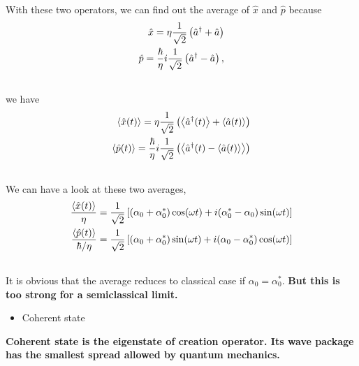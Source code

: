 \documentclass[letterpaper,10pt,english]{sphinxmanual}
\newcommand{\avg}[1]{\left< #1 \right>}
\begin{document}
With these two operators, we can find out the average of $\hat x$ and $\hat p$ because
\begin{gather}
\begin{split}\hat x = \eta \frac{1}{\sqrt 2} \left( \hat a^\dagger + \hat a\right)\\
\hat p = \frac{\hbar}{\eta} i \frac{1}{\sqrt 2} \left(\hat a^\dagger - \hat a \right) ,\end{split}\notag\\\begin{split}\end{split}\notag
\end{gather}
we have
\begin{gather}
\begin{split}\avg{\hat x(t)} = \eta \frac{1}{\sqrt 2} \left( \avg{\hat a^\dagger (t)} + \avg{\hat a(t)} \right) \\
\avg{\hat p(t)} = \frac{\hbar}{\eta} i \frac{1}{\sqrt {2} } \left( \avg{\hat a^\dagger (t) - \avg{\hat a(t)}} \right)\end{split}\notag\\\begin{split}\end{split}\notag
\end{gather}
We can have a look at these two averages,
\begin{gather}
\begin{split}\frac{\avg{\hat x(t)} }{\eta} = \frac{1}{\sqrt{2} } \left[ (\alpha_0 + \alpha_0^*)\cos(\omega t) + i (\alpha_0^* - \alpha_0 ) \sin(\omega t) \right] \\
\frac{\avg{\hat p(t)}}{\hbar/\eta} = \frac{1}{\sqrt{2}} \left[ (\alpha_0 + \alpha_0^*) \sin(\omega t) + i( \alpha_0 - \alpha_0^*)\cos(\omega t) \right]\end{split}\notag\\\begin{split}\end{split}\notag
\end{gather}
It is obvious that the average reduces to classical case if $\alpha_0 = \alpha_0^*$. \textbf{But this is too strong for a semiclassical limit.}
\begin{itemize}
\item {} 
Coherent state

\end{itemize}

\textbf{Coherent state is the eigenstate of creation operator. Its wave package has the smallest spread allowed by quantum mechanics.}
\end{document}
